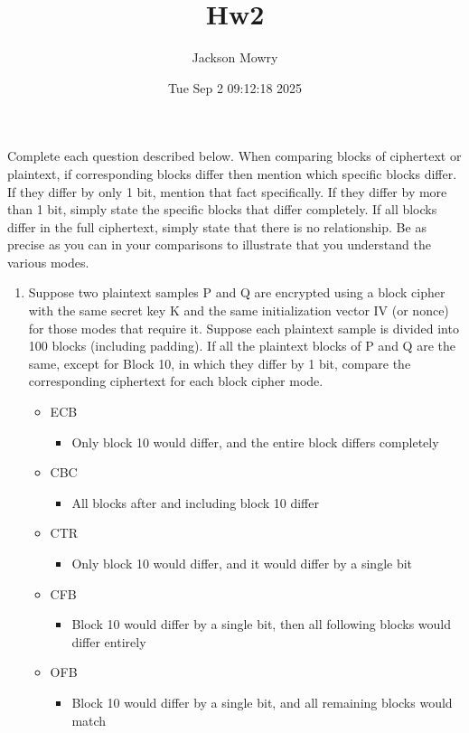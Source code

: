 \documentclass[11pt]{article}
\author{Jackson Mowry}
\date{Tue Sep  2 09:12:18 2025}
\title{Hw2}
\begin{document}
\maketitle
Complete each question described below. When comparing blocks of ciphertext or plaintext, if corresponding blocks differ then mention which specific blocks differ. If they differ by only 1 bit, mention that fact specifically. If they differ by more than 1 bit, simply state the specific blocks that differ completely. If all blocks differ in the full ciphertext, simply state that there is no relationship. Be as precise as you can in your comparisons to illustrate that you understand the various modes.

\begin{enumerate}
\item Suppose two plaintext samples P and Q are encrypted using a block cipher with the same secret key K and the same initialization vector IV (or nonce) for those modes that require it. Suppose each plaintext sample is divided into 100 blocks (including padding). If all the plaintext blocks of P and Q are the same, except for Block 10, in which they differ by 1 bit, compare the corresponding ciphertext for each block cipher mode.
\begin{itemize}
\item ECB
\begin{itemize}
\item Only block 10 would differ, and the entire block differs completely
\end{itemize}
\item CBC
\begin{itemize}
\item All blocks after and including block 10 differ
\end{itemize}
\item CTR
\begin{itemize}
\item Only block 10 would differ, and it would differ by a single bit
\end{itemize}
\item CFB
\begin{itemize}
\item Block 10 would differ by a single bit, then all following blocks would differ entirely
\end{itemize}
\item OFB
\begin{itemize}
\item Block 10 would differ by a single bit, and all remaining blocks would match

\end{itemize}
\end{itemize}
\end{enumerate}
\end{document}
